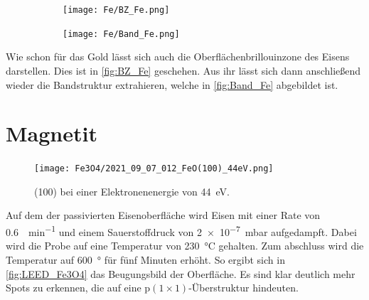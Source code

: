         \begin{figure}
            \begin{subfigure}[t]{0.34\textwidth}
                \centering
                \texttt{[image: Fe/BZ\_Fe.png]}
                \label{fig:BZ_Fe}
            \end{subfigure}
            \begin{subfigure}[t]{0.62\textwidth}
                \centering
                \texttt{[image: Fe/Band\_Fe.png]}
                \label{fig:Band_Fe}
            \end{subfigure}
        \end{figure}
        Wie schon für das Gold lässt sich auch die Oberflächenbrillouinzone des Eisens darstellen. 
        Dies ist in \autoref{fig:BZ_Fe} geschehen.
        Aus ihr lässt sich dann anschließend wieder die Bandstruktur extrahieren, welche in \autoref{fig:Band_Fe} abgebildet ist.
        

    \section{Magnetit}
        \begin{figure}
            \centering
            \texttt{[image: Fe3O4/2021\_09\_07\_012\_FeO(100)\_44eV.png]}
            \caption{ (100) bei einer Elektronenenergie von \SI{44}{\electronvolt}.}
            \label{fig:LEED_Fe3O4}
        \end{figure}
        Auf dem der passivierten Eisenoberfläche wird Eisen mit einer Rate von \SI{0.6}{\ML\per\minute} und einem Sauerstoffdruck von \SI{2e-7}{\milli\bar} aufgedampft.
        Dabei wird die Probe auf eine Temperatur von \SI{230}{\celsius} gehalten.
        Zum abschluss wird die Temperatur auf \SI{600}{\degree} für fünf Minuten erhöht.
        So ergibt sich in \autoref{fig:LEED_Fe3O4} das Beugungsbild der Oberfläche.
        Es sind klar deutlich mehr Spots zu erkennen, die auf eine $\text{p}(1 \times 1)$-Überstruktur hindeuten.

